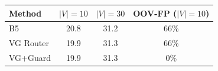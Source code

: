 \begin{tabular}{lccc}
\toprule
Method & $|V|{=}10$ & $|V|{=}30$ & OOV-FP ($|V|{=}10$) \\
\midrule
B5 & 20.8 & 31.2 & 66\% \\
VG Router & 19.9 & 31.3 & 66\% \\
VG+Guard & 19.9 & 31.3 & 0\% \\
\bottomrule
\end{tabular}
